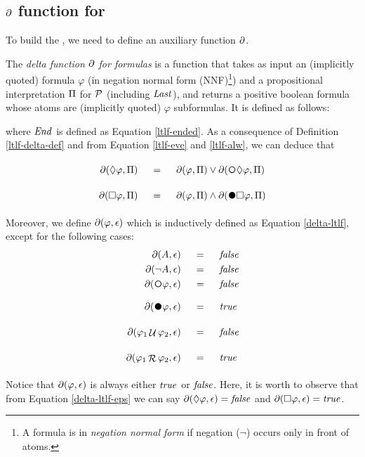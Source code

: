 \subsection{$\DfunSym$ function for \LTLf}\label{sec:ltlf-delta}
To build the \NFA, we need to define an auxiliary function $\DfunSym$.
\begin{definition}\label{ltlf-delta-def}
The \emph{delta function $\DfunSym$ for \LTLf formulas} is a function that takes as input an (implicitly quoted) \LTLf formula $\varphi$ (in negation normal form (NNF)\footnote{A formula is in \textit{negation normal form} if negation ($\lnot$) occurs only in front of atoms.}) and a propositional interpretation $\PropInt$ for $\P$ (including $\Last$), and returns a positive boolean formula whose atoms are (implicitly
quoted) $\varphi$ subformulas. It is defined as follows:

where $\Ended$ is defined as Equation \ref{ltlf-ended}. As a consequence of Definition \ref{ltlf-delta-def} and from Equation \ref{ltlf-eve} and \ref{ltlf-alw}, we can deduce that 
\begin{align*}
\Dfun{\Diamond \varphi} 	\ind &= \ind   \Dfun{\varphi} \lOR \Dfun{\Next \Diamond \varphi}\\
\Dfun{\Box \varphi} 	\ind &= \ind   \Dfun{\varphi} \lAND \Dfun{\Wnext \Box \varphi}
\end{align*}
	
Moreover, we define $\DfunEps{\varphi}$ which is inductively defined as Equation \ref{delta-ltlf}, except for the following cases:
\begin{align}
\begin{aligned}
\DfunEps{A} 			\ind &= \ind \false\\
\DfunEps{\lnot A} 			\ind &= \ind  \false\\
\DfunEps{\Next \varphi} 	\ind &= \ind   \false\\
\DfunEps{\Wnext \varphi} 	\ind &= \ind   \true\\
\DfunEps{\varphi_1 \lUntil \varphi_2} 	\ind &= \ind   \false\\
\DfunEps{\varphi_1 \Release \varphi_2} 	\ind &= \ind   \true\\
\label{delta-ltlf-eps}
\end{aligned}					
\end{align}
\end{definition}
Notice that $\DfunEps{\varphi}$ is always either $\true$ or $\false$. Here, it is worth to observe that from Equation \ref{delta-ltlf-eps} we can say $\DfunEps{\Diamond \varphi} = \false$ and $\DfunEps{\Box \varphi} = \true$.
